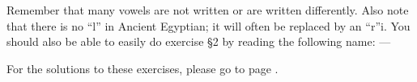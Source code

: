 \documentclass[a5paper,twoside,11pt]{report}
\begin{document}
		\begin{center}
			\begin{hieroglyph}{\leavevmode {}%
}\end{hieroglyph} \bigskip\linebreak\bigskip
			\begin{hieroglyph}{\leavevmode {}%
}\end{hieroglyph} \linebreak\bigskip
			\begin{hieroglyph}{\leavevmode {}%
}\end{hieroglyph} \linebreak\bigskip
			\begin{hieroglyph}{\leavevmode {}%
}\end{hieroglyph} \linebreak\bigskip
			\begin{hieroglyph}{\leavevmode {}%
}\end{hieroglyph} \linebreak
		\end{center}

		Remember that many vowels are not written or are written differently. Also note that there is no “l” in Ancient Egyptian; it will often be replaced by an “r”i.
		You should also be able to easily do exercise §2 by reading the following name: —
      \begin{center}
      \end{center}
    For the solutions to these exercises, please go to page \pageref{solutions}.
\end{document}
